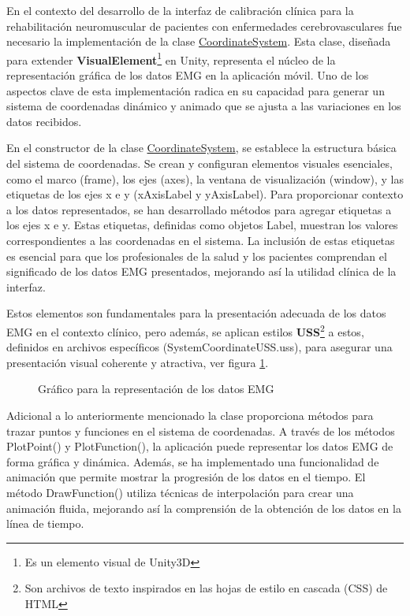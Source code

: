 En el contexto del desarrollo de la interfaz de calibración clínica para la rehabilitación neuromuscular de pacientes con enfermedades cerebrovasculares fue necesario la implementación de la clase \underline{CoordinateSystem}. Esta clase, diseñada para extender \textbf{VisualElement}\footnote{Es un elemento visual de Unity3D} en Unity, representa el núcleo de la representación gráfica de los datos EMG en la aplicación móvil. Uno de los aspectos clave de esta implementación radica en su capacidad para generar un sistema de coordenadas dinámico y animado que se ajusta a las variaciones en los datos recibidos.

\vspace{5pt}
En el constructor de la clase \underline{CoordinateSystem}, se establece la estructura básica del sistema de coordenadas. Se crean y configuran elementos visuales esenciales, como el marco (frame), los ejes (axes), la ventana de visualización (window), y las etiquetas de los ejes x e y (xAxisLabel y yAxisLabel). Para proporcionar contexto a los datos representados, se han desarrollado métodos para agregar etiquetas a los ejes x e y. Estas etiquetas, definidas como objetos Label, muestran los valores correspondientes a las coordenadas en el sistema. La inclusión de estas etiquetas es esencial para que los profesionales de la salud y los pacientes comprendan el significado de los datos EMG presentados, mejorando así la utilidad clínica de la interfaz. 
    
\vspace{5pt}
Estos elementos son fundamentales para la presentación adecuada de los datos EMG en el contexto clínico, pero además, se aplican estilos \textbf{USS}\footnote{Son archivos de texto inspirados en las hojas de estilo en cascada (CSS) de HTML} a estos, definidos en archivos específicos (SystemCoordinateUSS.uss), para asegurar una presentación visual coherente y atractiva, ver figura \ref{fig: graph-emg}.

\begin{figure}[ht]
    \centering
    \caption{Gráfico para la representación de los datos EMG}
    \label{fig: graph-emg}
\end{figure}

Adicional a lo anteriormente mencionado la clase proporciona métodos para trazar puntos y funciones en el sistema de coordenadas. A través de los métodos PlotPoint() y PlotFunction(), la aplicación puede representar los datos EMG de forma gráfica y dinámica. Además, se ha implementado una funcionalidad de animación que permite mostrar la progresión de los datos en el tiempo. El método DrawFunction() utiliza técnicas de interpolación para crear una animación fluida, mejorando así la comprensión de la obtención de los datos en la línea de tiempo.
